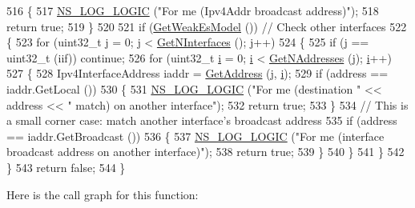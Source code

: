 \begin{DoxyCode}
516     \{
517       \hyperlink{group__logging_ga88acd260151caf2db9c0fc84997f45ce}{NS\_LOG\_LOGIC} (\textcolor{stringliteral}{"For me (Ipv4Addr broadcast address)"});
518       \textcolor{keywordflow}{return} \textcolor{keyword}{true};
519     \}
520 
521   \textcolor{keywordflow}{if} (\hyperlink{classns3_1_1Ipv4L3Protocol_ad6249ba16ffc906ac0041ce89bdc2cac}{GetWeakEsModel} ())  \textcolor{comment}{// Check other interfaces}
522     \{ 
523       \textcolor{keywordflow}{for} (uint32\_t j = 0; j < \hyperlink{classns3_1_1Ipv4L3Protocol_a6ab2be11c0df97f2d1170bbc737c9628}{GetNInterfaces} (); j++)
524         \{
525           \textcolor{keywordflow}{if} (j == uint32\_t (iif)) \textcolor{keywordflow}{continue};
526           \textcolor{keywordflow}{for} (uint32\_t \hyperlink{bernuolliDistribution_8m_a6f6ccfcf58b31cb6412107d9d5281426}{i} = 0; \hyperlink{bernuolliDistribution_8m_a6f6ccfcf58b31cb6412107d9d5281426}{i} < \hyperlink{classns3_1_1Ipv4L3Protocol_ab816ec1b5f680117bc1363b3d9649b22}{GetNAddresses} (j); \hyperlink{bernuolliDistribution_8m_a6f6ccfcf58b31cb6412107d9d5281426}{i}++)
527             \{
528               Ipv4InterfaceAddress iaddr = \hyperlink{classns3_1_1Ipv4L3Protocol_a85fa4287313a773dee29aa73fa74a7e0}{GetAddress} (j, \hyperlink{bernuolliDistribution_8m_a6f6ccfcf58b31cb6412107d9d5281426}{i});
529               \textcolor{keywordflow}{if} (address == iaddr.GetLocal ())
530                 \{
531                   \hyperlink{group__logging_ga88acd260151caf2db9c0fc84997f45ce}{NS\_LOG\_LOGIC} (\textcolor{stringliteral}{"For me (destination "} << address << \textcolor{stringliteral}{" match) on another
       interface"});
532                   \textcolor{keywordflow}{return} \textcolor{keyword}{true};
533                 \}
534               \textcolor{comment}{//  This is a small corner case:  match another interface's broadcast address}
535               \textcolor{keywordflow}{if} (address == iaddr.GetBroadcast ())
536                 \{
537                   \hyperlink{group__logging_ga88acd260151caf2db9c0fc84997f45ce}{NS\_LOG\_LOGIC} (\textcolor{stringliteral}{"For me (interface broadcast address on another interface)"});
538                   \textcolor{keywordflow}{return} \textcolor{keyword}{true};
539                 \}
540             \}
541         \}
542     \}
543   \textcolor{keywordflow}{return} \textcolor{keyword}{false};
544 \}
\end{DoxyCode}


Here is the call graph for this function\+:


